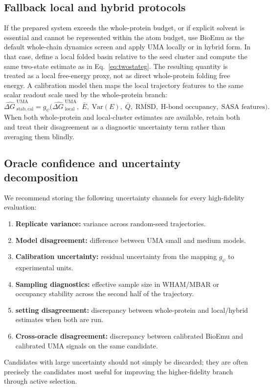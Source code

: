 \documentclass[11pt]{article}
\newcommand{\Var}{\ensuremath{\mathrm{Var}}}
\newcommand{\dG}{\ensuremath{\Delta G \ }}
\begin{document}
\subsection{Fallback local and hybrid protocols}

If the prepared system exceeds the whole-protein budget, or if explicit solvent is essential and cannot be represented within the atom budget, use BioEmu as the default whole-chain dynamics screen and apply UMA locally or in hybrid form. In that case, define a local folded basin relative to the seed cluster and compute the same two-state estimate as in Eq.~\eqref{eq:twostateg}. The resulting quantity is treated as a local free-energy proxy, not as direct whole-protein folding free energy. A calibration model then maps the local trajectory features to the same scalar readout scale used by the whole-protein branch:
\begin{equation}
    \widehat{\dG}^{\mathrm{UMA}}_{\mathrm{stab,cal}} = g_\psi\Big(\widehat{\dG}^{\mathrm{UMA}}_{\mathrm{local}},\; \bar E,\; \Var(E),\; \bar Q,\; \overline{\mathrm{RMSD}},\; \text{H-bond occupancy},\; \text{SASA features}\Big).
\end{equation}
When both whole-protein and local-cluster estimates are available, retain both and treat their disagreement as a diagnostic uncertainty term rather than averaging them blindly.

\subsection{Oracle confidence and uncertainty decomposition}

We recommend storing the following uncertainty channels for every high-fidelity evaluation:
\begin{enumerate}[leftmargin=1.5em]
    \item \textbf{Replicate variance:} variance across random-seed trajectories.
    \item \textbf{Model disagreement:} difference between UMA small and medium models.
    \item \textbf{Calibration uncertainty:} residual uncertainty from the mapping $g_\psi$ to experimental units.
    \item \textbf{Sampling diagnostics:} effective sample size in WHAM/MBAR or occupancy stability across the second half of the trajectory.
    \item \textbf{setting disagreement:} discrepancy between whole-protein and local/hybrid estimates when both are run.
    \item \textbf{Cross-oracle disagreement:} discrepancy between calibrated BioEmu and calibrated UMA signals on the same candidate.
\end{enumerate}
Candidates with large uncertainty should not simply be discarded; they are often precisely the candidates most useful for improving the higher-fidelity branch through active selection.
\end{document}
